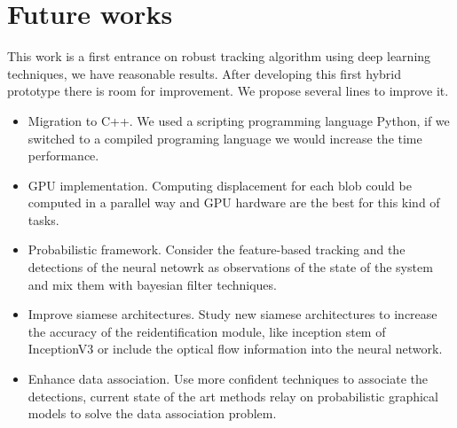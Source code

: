 \section{Future works}


This work is a first entrance on robust tracking algorithm using deep learning techniques, we have reasonable results. After developing this first hybrid prototype there is room for improvement. We propose several lines to improve it.


\begin{itemize}

\item Migration to C++. We used a scripting programming language Python, if we switched to a compiled programing language we would increase the time performance.

\item GPU implementation. Computing displacement for each blob could be computed in a parallel way and GPU hardware are the best for this kind of tasks.

\item Probabilistic framework. Consider the feature-based tracking and the detections of the neural netowrk as observations of the state of the system and mix them with bayesian filter techniques.

\item Improve siamese architectures. Study new siamese architectures to increase the accuracy of the reidentification module, like inception stem of InceptionV3 or include the optical flow information into the neural network.

\item Enhance data association. Use more confident techniques to associate the detections, current state of the art methods relay on probabilistic graphical models to solve the data association problem.

\end{itemize}


